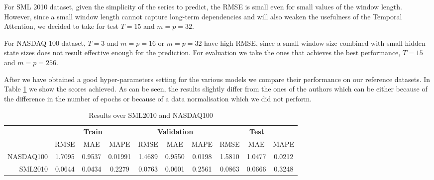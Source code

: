 \documentclass{article}
\begin{document}
For SML 2010 dataset, given the simplicity of the series to predict, the RMSE is small even for
small values of the window length. However, since a small window length cannot capture 
long-term dependencies and will also weaken the usefulness of the Temporal Attention,
we decided to take for test $T = 15$ and $m=p=32$.

For NASDAQ 100 dataset, $T=3$ and $m=p=16$ or $m=p=32$ have high RMSE, since a small window
size combined with small hidden state sizes does not result effective enough for the 
prediction. For evaluation we take the ones that achieves the best performance,
$T=15$ and $m=p=256$.

After we have obtained a good hyper-parameters setting for the various models we 
compare their performance on our reference datasets. 
In Table \ref{results} we show the scores achieved. As can be seen, the results slightly differ
from the ones of the authors which can be either because of the difference in the number of epochs
or because of a data normalisation which we did not perform.
\begin{center}
\begin{table}
\begin{tabular}{r|c|c|c|c|c|c|c|c|c|}
\multicolumn{1}{r}{}
  & \multicolumn{3}{c}{\textbf{Train}}
  & \multicolumn{3}{c}{\textbf{Validation}}
  & \multicolumn{3}{c}{\textbf{Test}} \\
  \cline{2-10}
  & \multicolumn{1}{c}{RMSE}
  & \multicolumn{1}{c}{MAE}
  & \multicolumn{1}{c|}{MAPE} 
  & \multicolumn{1}{c}{RMSE}
  & \multicolumn{1}{c}{MAE}
  & \multicolumn{1}{c|}{MAPE}
  & \multicolumn{1}{c}{RMSE}
  & \multicolumn{1}{c}{MAE}
  & \multicolumn{1}{c|}{MAPE}\\
\cline{2-10}
NASDAQ100 & 1.7095 & 0.9537 & 0.01991 & 1.4689 & 0.9550 & 0.0198 & 1.5810 & 1.0477 & 0.0212 \\
\cline{2-10}
SML2010 & 0.0644 & 0.0434 & 0.2279 & 0.0763 & 0.0601 & 0.2561 & 0.0863 & 0.0666 & 0.3248 \\
\cline{2-10}
\end{tabular}
\vspace{1em}
\caption{Results over SML2010 and NASDAQ100}
\label{results}
\end{table}
\end{center}
\end{document}
